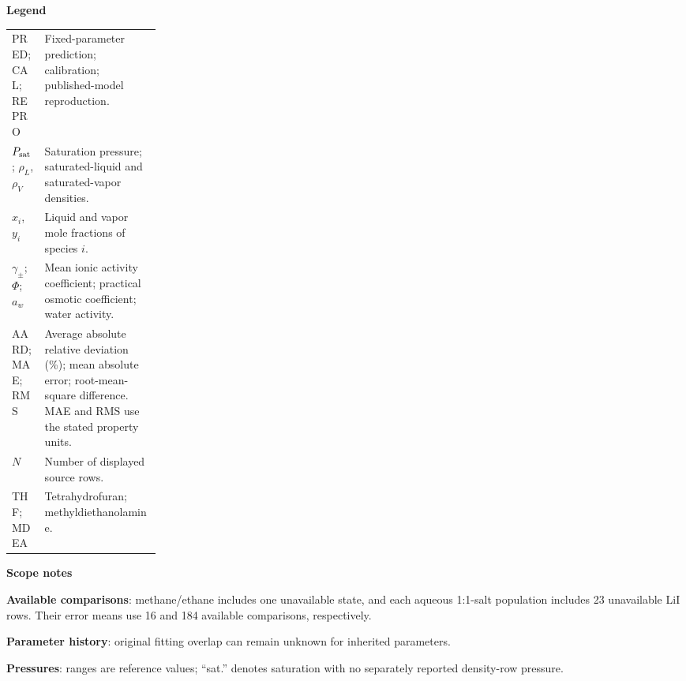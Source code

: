 \begin{table}[pos=htbp]
\medskip
\begin{minipage}{\linewidth}
\footnotesize\raggedright
\textbf{Legend}\par\smallskip
\begin{tabularx}{\linewidth}{@{}p{0.22\linewidth}X@{}}
PRED; CAL; REPRO & Fixed-parameter prediction; calibration; published-model reproduction. \\
$P_{\rm sat}$; $\rho_L$, $\rho_V$ & Saturation pressure; saturated-liquid and saturated-vapor densities. \\
$x_i$, $y_i$ & Liquid and vapor mole fractions of species $i$. \\
$\gamma_\pm$; $\Phi$; $a_w$ & Mean ionic activity coefficient; practical osmotic coefficient; water activity. \\
AARD; MAE; RMS & Average absolute relative deviation (\%); mean absolute error; root-mean-square difference. MAE and RMS use the stated property units. \\
$N$ & Number of displayed source rows. \\
THF; MDEA & Tetrahydrofuran; methyldiethanolamine. \\
\end{tabularx}
\smallskip
\textbf{Scope notes}\par\smallskip
\textbf{Available comparisons}: methane/ethane includes one unavailable state, and each aqueous 1:1-salt population includes 23 unavailable LiI rows. Their error means use 16 and 184 available comparisons, respectively.
\par\smallskip
\textbf{Parameter history}: original fitting overlap can remain unknown for inherited parameters.
\par\smallskip
\textbf{Pressures}: ranges are reference values; ``sat.'' denotes saturation with no separately reported density-row pressure.
\end{minipage}
\end{table}

